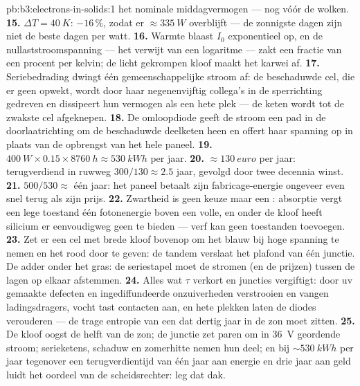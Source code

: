 \begin{solution}{pb:b3:electrons-in-solids:1}
het nominale middagvermogen --- nog vóór de wolken.
\textbf{15.} $\Delta T = \qty{40}{K}$: $-16\,\%$, zodat er
$\approx\qty{335}{W}$ overblijft --- de zonnigste dagen zijn niet de beste
dagen per watt.
\textbf{16.} Warmte blaast $I_0$ exponentieel op, en de
nullaststroomspanning --- het verwijt van een logaritme --- zakt een
fractie van een procent per kelvin; de licht gekrompen kloof
maakt het karwei af.
\textbf{17.} Seriebedrading dwingt één gemeenschappelijke stroom af: de beschaduwde
cel, die er geen opwekt, wordt door haar negenenvijftig collega's in de
sperrichting gedreven en dissipeert hun vermogen als een hete plek
--- de keten wordt tot de zwakste cel afgeknepen.
\textbf{18.} De omloopdiode geeft de stroom een pad in de doorlaatrichting
om de beschaduwde deelketen heen en offert haar spanning op in plaats van
de opbrengst van het hele paneel.
\textbf{19.} $\qty{400}{W}\times0.15\times\qty{8760}{h} \approx
\qty{530}{kWh}$ per jaar.
\textbf{20.} $\approx\qty{130}{euro}$ per jaar: terugverdiend in
ruwweg $300/130 \approx 2.5$ jaar, gevolgd door twee decennia winst.
\textbf{21.} $500/530 \approx$ één jaar: het paneel betaalt zijn
fabricage-energie ongeveer even snel terug als zijn prijs.
\textbf{22.} Zwartheid is geen keuze maar een :
absorptie vergt een lege toestand één fotonenergie boven een volle,
en onder de kloof heeft silicium er eenvoudigweg geen te bieden ---
verf kan geen toestanden toevoegen.
\textbf{23.} Zet er een cel met brede kloof bovenop om het blauw bij
hoge spanning te nemen en het rood door te geven: de tandem verslaat het
plafond van één junctie. De adder onder het gras: de seriestapel moet de
stromen (en de prijzen) tussen de lagen op elkaar afstemmen.
\textbf{24.} Alles wat $\tau$ verkort en juncties vergiftigt:
door uv gemaakte defecten en ingediffundeerde onzuiverheden verstrooien en vangen
ladingsdragers, vocht tast contacten aan, en hete plekken laten de
diodes verouderen --- de trage entropie van een  dat dertig jaar
in de zon moet zitten.
\textbf{25.} De kloof oogst de helft van de zon; de junctie zet
paren om in \qty{36}{V} geordende stroom; serieketens,
schaduw en zomerhitte nemen hun deel; en bij
$\sim\qty{530}{kWh}$ per jaar tegenover een terugverdientijd van één jaar aan energie en
drie jaar aan geld luidt het oordeel van de scheidsrechter: leg dat dak.
\end{solution}
